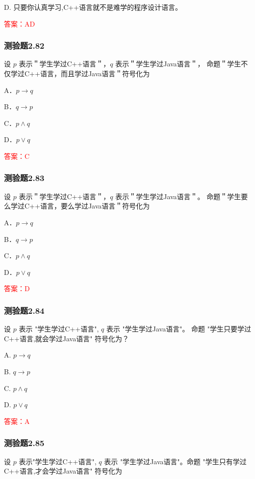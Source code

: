 \documentclass[UTF8, heading=true]{ctexart}
\begin{document}
D. 只要你认真学习,C++语言就不是难学的程序设计语言。

\textcolor{red}{答案：AD}

\subsubsection{测验题2.82}

设 $p$ 表示＂学生学过C++语言＂，$q$ 表示＂学生学过Java语言＂，
命题＂学生不仅学过C++语言，而且学过Java语言＂符号化为 $\qquad$

A．$p \rightarrow q$

B．$q \rightarrow p$

C．$p \wedge q$

D．$p \vee q$

\textcolor{red}{答案：C}

\subsubsection{测验题2.83}

设 $p$ 表示＂学生学过C++语言＂，$q$ 表示＂学生学过Java语言＂。
命题＂学生要么学过C++语言，要么学过Java语言＂符号化为 $\qquad$

A．$
p \rightarrow q
$


B．$
q \rightarrow p
$


C．$
p \wedge q
$


D．$
p \vee q
$

\textcolor{red}{答案：D}



\subsubsection{测验题2.84}

设 $p$ 表示 "学生学过C++语言", $q$ 表示 "学生学过Java语言"。
命题 "学生只要学过C++语言,就会学过Java语言" 符号化为？

A. $ p \rightarrow q$

B. $ q \rightarrow p$

C. $ p \wedge q$

D. $ p \vee q$

\textcolor{red}{答案：A}

\subsubsection{测验题2.85}

设 $p$ 表示"学生学过C++语言", $q$ 表示 "学生学过Java语言"。命题 "学生只有学过C++语言,才会学过Java语言" 符号化为 $\qquad$
\end{document}
